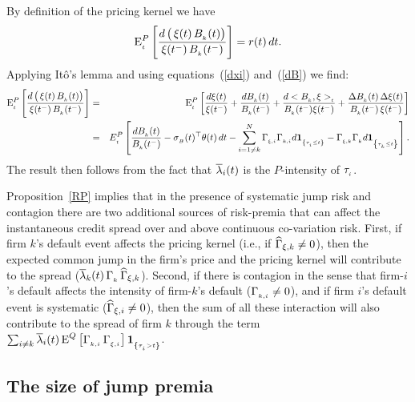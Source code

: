 \documentclass[titlepage,11pt]{article}
\def\big{\begin{array}{c} \\ \end{array} \!\!\!\!\!}
\def\bq{\begin{equation}}
\def\eq{\end{equation}}
\def\by{\begin{eqnarray}}
\def\ey{\end{eqnarray}}
\begin{document}
  By definition of the pricing kernel we have
\bq \E^P\sub{t}\left[\frac{d \left( \big \xi(t) \, B\sub{k}(t)
\right)}{\xi(t^{-}) \, B\sub{k}(t^{-})} \right]= r(t) \, dt. \eq
Applying It\^o's lemma and using equations~(\ref{dxi})
and~(\ref{dB}) we find: \by \E^P\sub{t}\left[\frac{d\left( \big
\xi(t) \, B\sub{k}(t)\right)}{\xi(t^{-}) \, B\sub{k}(t^-)}\right]&=&
\E^P\sub{t}\left[\frac{d\xi(t)}{\xi(t^{-})}+
\frac{dB\sub{k}(t)}{B\sub{k}(t^-)} +
\frac{d<B\sub{k},\xi>\sub{t}}{B\sub{k}(t^-)\xi(t^-)}+
\frac{\Delta B\sub{k}(t) \, \Delta\xi(t)}{B\sub{k}(t^-) \, \xi(t^-)} \right] \\
%
&=& E^P\sub{t}\left[ \frac{dB\sub{k}(t)}{B\sub{k}(t^-)}
-\sigma\sub{B}(t)^\top\theta(t)\, dt - \sum_{i=1\neq
k}^N\Gamma\sub{\xi,i}\Gamma\sub{k,i}d\ind{\tau\sub{i}\leq
t}-\Gamma\sub{\xi,k}\Gamma\sub{k} d\ind{\tau\sub{k}\leq t}\right].
\nonumber \ey The result then follows from the fact that $\overline{\lambda}_i(t)$
is the $P$-intensity of $\tau_{_{{i}}}$.

\eproof

\vspace*{3mm} \noindent Proposition~\ref{RP} implies that in the
presence of systematic jump risk and contagion there are two
additional sources of risk-premia that can affect the instantaneous
credit spread over and above continuous co-variation risk. First, if
firm $k$'s default event affects the pricing kernel (i.e., if
${\widehat \Gamma}_{\xi,k}\neq 0$), then the expected common jump in the firm's
price and the pricing kernel will contribute to the spread
($\overline{\lambda}_k(t) \, \Gamma_{_{{k}}} \, {\widehat \Gamma}_{\xi,k}$). Second, if there is
contagion in the sense that firm-$i$'s default affects the intensity
of firm-$k$'s default ($\Gamma_{_{{k,i}}}\neq 0$),  and if firm $i$'s
default event is systematic (${\widehat \Gamma}_{\xi,i}\neq 0$), then the sum of
all these interaction will also contribute to the spread of firm $k$
through the term $\sum_{i\neq k} \overline{\lambda}_i(t) \, \mbox{E}^{Q}\left[
\Gamma_{_{{k,i}}} \, \Gamma_{_{{\xi,i}}} \right] {\bf 1}_{_{{\left\{{\tau_{_{{i}}} > t}\right\}}}}$.

\subsection{The size of jump premia}\label{jumpsize}
\end{document}
